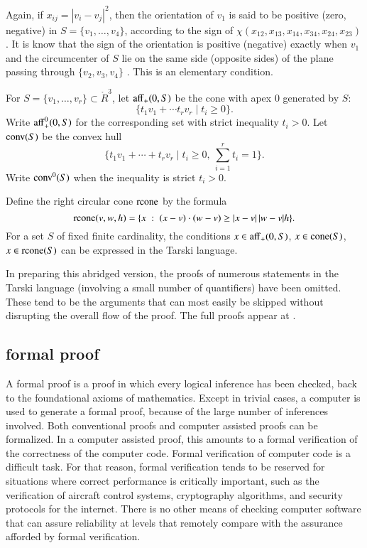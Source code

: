 Again, if $x_{ij}=|v_i-v_j|^2$, then the orientation
of $v_1$ is said to be positive (zero, negative) in $S=\{v_1,\ldots,v_4\}$,
according to the sign of $\chi(x_{12},x_{13},x_{14},x_{34},x_{24},x_{23})$.
It is know that the sign of the orientation is positive (negative) exactly
when $v_1$ and the circumcenter of $S$ lie on the same side (opposite sides) of the
plane passing through $\{v_2,v_3,v_4\}$ \cite[Lemma~5.15]{DCG}.  This is an elementary condition. 

For $S=\{v_1,\ldots,v_r\}\subset\ring{R}^3$, let ${\operatorname{aff}}_+(0,S)$
be the cone with apex $0$ generated by $S$:
  $$
  \{ t_1 v_1 + \cdots t_r v_r \mid  t_i \ge 0\}.
  $$
Write ${\operatorname{aff}}_+^0(0,S)$ for the corresponding set with
strict inequality $t_i >0$.
Let ${\operatorname{conv}}(S)$ be the convex hull
  $$
  \{ t_1 v_1 + \cdots + t_r v_r \mid t_i \ge 0,\ \sum_{i=1}^r t_i=1\}.
  $$
Write ${\operatorname{conv}}^0(S)$ when the inequality is strict $t_i >0$.

Define the right circular cone ${\operatorname{rcone}}$ by the formula
$${\operatorname{rcone}}(v,w,h) = \{x\ :\  (x-v)\cdot (w-v) \ge |x-v|\,|w-v| h\}.$$
For a set $S$ of fixed finite cardinality, the conditions $x\in{\operatorname{aff}}_+(0,S)$,
$x\in{\operatorname{cone}}(S)$, $x\in{\operatorname{rcone}}(S)$ can be expressed
in the Tarski language.

In preparing this abridged version, the proofs of numerous statements
in the Tarski language (involving a small number of quantifiers) have
been omitted.  These tend to be the arguments that can most easily
be skipped without disrupting the overall flow of the proof.
The full proofs appear at \cite{arx}.



\subsection{formal proof}

A formal proof is a proof in which every logical inference has
been checked, back to the foundational axioms of mathematics. 
Except in trivial cases, a computer is used to generate a formal
proof, because of the large number of inferences involved.
Both conventional proofs and computer assisted proofs can be
formalized.  In a computer assisted proof, this amounts to a
formal verification of the correctness of the computer code.
Formal verification of computer code is a difficult task.
For that reason,  formal verification tends to be reserved
for situations where correct performance 
is critically important, such as the verification of aircraft
control systems, cryptography algorithms, 
and security protocols for the internet.
There is no other means of checking 
computer software that can assure reliability at levels that
remotely compare with the
assurance afforded by formal verification. 




